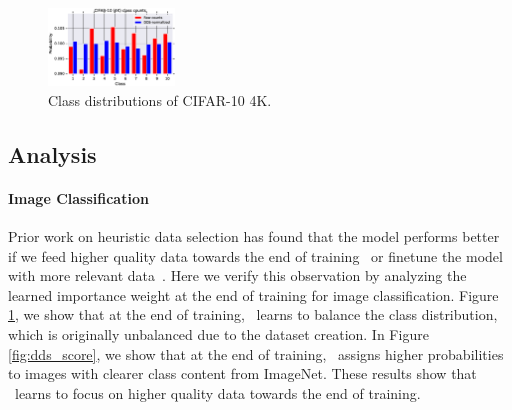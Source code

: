 
\begin{figure}
  \vspace{-12mm}
  \begin{center}
    \includegraphics[width=0.3\textwidth]{figs/cifar10_dds.eps}
  \end{center}
  \vspace{-4mm}
  \caption{\label{fig:dds_distribution}Class distributions of CIFAR-10 4K. }
  \vspace{-4mm}
\end{figure}

\subsection{Analysis}
 \paragraph{Image Classification}
 Prior work on heuristic data selection has found that the model performs better if we feed higher quality data towards the end of training~\citep{dynamic_data_selection_nmt} or finetune the model with more relevant data~\citep{dynamic}. Here we verify this observation by analyzing the learned importance weight at the end of training for image classification. Figure \ref{fig:dds_distribution}, we show that at the end of training, \dds~learns to balance the class distribution, which is originally unbalanced due to the dataset creation. In Figure \ref{fig:dds_score}, we show that at the end of training, \dds~assigns higher probabilities to images with clearer class content from ImageNet. These results show that \dds~learns to focus on higher quality data towards the end of training.  

